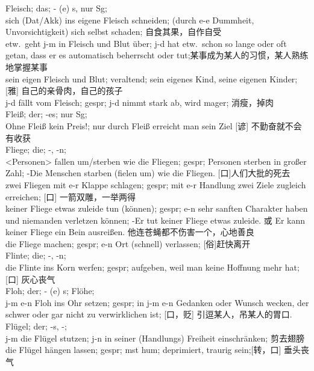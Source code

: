 \noindent
Fleisch; das; \-- (e) s, nur Sg;\\
sich (Dat/Akk) ins eigene Fleisch schneiden; (durch e-e Dummheit, Unvorsichtigkeit) sich selbst schaden; 自食其果，自作自受\\
etw.\ geht j-m in Fleisch und Blut \"uber; j-d hat etw.\ schon so lange oder oft getan, dass er es automatisch beherrscht oder tut;某事成为某人的习惯，某人熟练地掌握某事\\
sein eigen Fleisch und Blut; veraltend; sein eigenes Kind, seine eigenen Kinder; [雅] 自己的亲骨肉，自己的孩子\\
j-d f\"allt vom Fleisch; gespr; j-d nimmt stark ab, wird mager; 消瘦，掉肉\\

\noindent
Flei\ss{}; der; -es; nur Sg; \\
Ohne Flei\ss{} kein Preis!; nur durch Flei\ss{} erreicht man sein Ziel [谚] 不勤奋就不会有收获\\

\noindent
Fliege; die; -, -n; \\
<Personen> fallen um/sterben wie die Fliegen; gespr; Personen sterben in gro\ss{}er Zahl; -Die Menschen starben (fielen um) wie die Fliegen. [口]人们大批的死去\\
zwei Fliegen mit e-r Klappe schlagen; gespr; mit e-r Handlung zwei Ziele zugleich erreichen; [口] 一箭双雕，一举两得\\
keiner Fliege etwas zuleide tun (k\"onnen); gespr; e-n sehr sanften Charakter haben und niemanden verletzen k\"onnen; -Er tut keiner Fliege etwas zuleide. 或 Er kann keiner Fliege ein Bein ausrei\ss{}en. 他连苍蝇都不伤害一个，心地善良\\
die Fliege machen; gespr; e-n Ort (schnell) verlassen; [俗]赶快离开\\

\noindent
Flinte; die; -, -n;\\
die Flinte ins Korn werfen; gespr; aufgeben, weil man keine Hoffnung mehr hat; [口] 灰心丧气\\

\noindent
Floh; der; \-- (e) s; Fl\"ohe;\\
j-m e-n Floh ins Ohr setzen; gespr; in j-m e-n Gedanken oder Wunsch wecken, der schwer oder gar nicht zu verwirklichen ist; [口，贬] 引逗某人，吊某人的胃口.\\

\noindent
Fl\"ugel; der; \--s, -; \\
j-m die Fl\"ugel stutzen; j-n in seiner (Handlungs) Freiheit einschr\"anken; 剪去翅膀 \\
die Fl\"ugel h\"angen lassen; gespr; mst hum; deprimiert, traurig sein;[转，口] 垂头丧气\\

